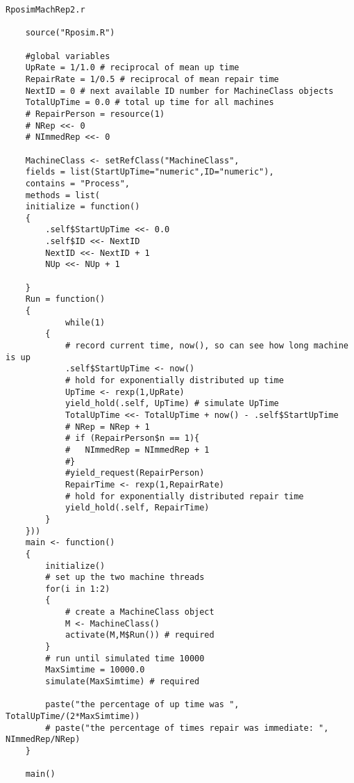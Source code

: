 \documentclass[titlepage]{article}
\begin{document}
\begin{verbatim}
RposimMachRep2.r

    source("Rposim.R")

    #global variables
    UpRate = 1/1.0 # reciprocal of mean up time
    RepairRate = 1/0.5 # reciprocal of mean repair time
    NextID = 0 # next available ID number for MachineClass objects
    TotalUpTime = 0.0 # total up time for all machines
    # RepairPerson = resource(1)
    # NRep <<- 0
    # NImmedRep <<- 0

    MachineClass <- setRefClass("MachineClass",
    fields = list(StartUpTime="numeric",ID="numeric"),
    contains = "Process",
    methods = list(
    initialize = function()
    {
        .self$StartUpTime <<- 0.0
        .self$ID <<- NextID
        NextID <<- NextID + 1
        NUp <<- NUp + 1

    }
    Run = function()
    {
            while(1)
        {  
            # record current time, now(), so can see how long machine is up
            .self$StartUpTime <- now()
            # hold for exponentially distributed up time
            UpTime <- rexp(1,UpRate)
            yield_hold(.self, UpTime) # simulate UpTime
            TotalUpTime <<- TotalUpTime + now() - .self$StartUpTime
            # NRep = NRep + 1
            # if (RepairPerson$n == 1){
            #	NImmedRep = NImmedRep + 1
            #}
            #yield_request(RepairPerson)
            RepairTime <- rexp(1,RepairRate)
            # hold for exponentially distributed repair time
            yield_hold(.self, RepairTime)
        }
    }))
    main <- function()
    {
        initialize()
        # set up the two machine threads
        for(i in 1:2)
        {
            # create a MachineClass object
            M <- MachineClass()
            activate(M,M$Run()) # required
        }
        # run until simulated time 10000
        MaxSimtime = 10000.0
        simulate(MaxSimtime) # required

        paste("the percentage of up time was ", TotalUpTime/(2*MaxSimtime))
        # paste("the percentage of times repair was immediate: ", NImmedRep/NRep)
    }

    main()
    
\end{verbatim}

\clearpage
\end{document}
